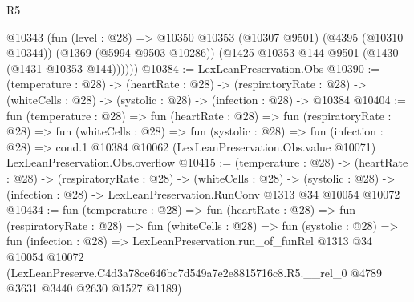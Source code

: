\begin{lexlean}{R5}
\begin{coremodule}
      @10343
        (fun (level : @28) =>
        @10350
          @10353
          (@10307 @9501)
          (@4395 (@10310 @10344))
          (@1369 (@5994 @9503 @10286))
          (@1425 @10353 @144 @9501 (@1430 (@1431 @10353 @144))))))
@10384 := LexLeanPreservation.Obs
@10390 := (temperature : @28) ->
  (heartRate : @28) ->
  (respiratoryRate : @28) -> (whiteCells : @28) -> (systolic : @28) -> (infection : @28) -> @10384
@10404 := fun (temperature : @28) =>
  fun (heartRate : @28) =>
  fun (respiratoryRate : @28) =>
  fun (whiteCells : @28) =>
  fun (systolic : @28) =>
  fun (infection : @28) =>
  cond.{1} @10384 @10062 (LexLeanPreservation.Obs.value @10071) LexLeanPreservation.Obs.overflow
@10415 := (temperature : @28) ->
  (heartRate : @28) ->
  (respiratoryRate : @28) ->
  (whiteCells : @28) ->
  (systolic : @28) -> (infection : @28) -> LexLeanPreservation.RunConv @1313 @34 @10054 @10072
@10434 := fun (temperature : @28) =>
  fun (heartRate : @28) =>
  fun (respiratoryRate : @28) =>
  fun (whiteCells : @28) =>
  fun (systolic : @28) =>
  fun (infection : @28) =>
  LexLeanPreservation.run_of_funRel
    @1313
    @34
    @10054
    @10072
    (LexLeanPreserve.C4d3a78ce646bc7d549a7e2e8815716c8.R5.__rel_0
      @4789
      @3631
      @3440
      @2630
      @1527
      @1189)
\end{coremodule}
\end{lexlean}
